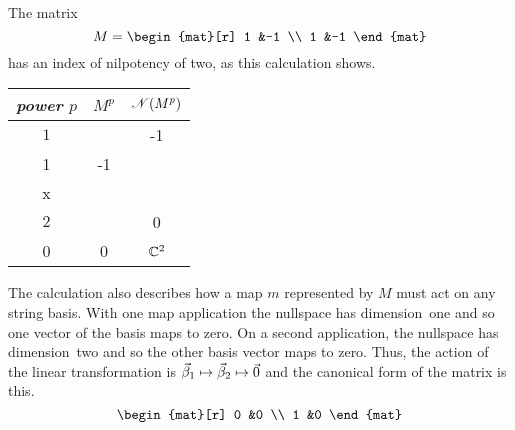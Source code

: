\begin{example}
The matrix
\begin{equation*}
  M=\begin{mat}[r]
      1  &-1  \\
      1  &-1
    \end{mat}
\end{equation*}
has an index of nilpotency of two, as this calculation shows.
\begin{center}
  \begin{tabular}{c|cc}
    \multicolumn{1}{c}{\textit{power} \( p \)}  &\( M^p \)  &\( \mathscr{N}(M^p)  \)   \\  
    \hline
    \( 1 \)
    &\(  
       M=\matrixvenlarge{\begin{mat}[r]
         1  &-1  \\
         1  &-1
       \end{mat}}  \)
    &\( \set{\matrixvenlarge{\colvec{x \\ x}}\suchthat
                               x\in\C}  \)   \\
    \( 2 \)
    &\(  M^2=\matrixvenlarge{\begin{mat}[r]
         0  &0   \\
         0  &0
       \end{mat}}  \)
    &\( \mathbb{C}^2  \)
  \end{tabular}
\end{center}
The calculation also describes how a map $m$ represented by $M$ must act on any
string basis.
With one map application the nullspace has dimension~one and so one
vector of the basis maps to zero.
On a second application, the nullspace has dimension~two and so
the other basis vector maps to zero. 
Thus, the action of the linear transformation is
$\vec{\beta}_1\mapsto\vec{\beta}_2\mapsto\vec{0}$ 
and the canonical form of the matrix is this.
\begin{equation*}
  \begin{mat}[r]
    0  &0  \\
    1  &0
  \end{mat}
\end{equation*}


\end{example}
